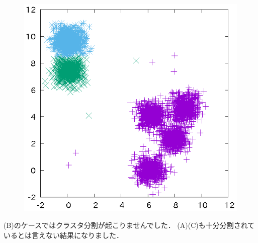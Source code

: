 ﻿\documentclass{jsarticle}
\begin{document}
\begin{figure}[h]
\begin{center}
\begin{minipage}{.32\textwidth}
\begin{center}
 \end{center}
 \end{minipage}
 \begin{minipage}{.32\textwidth}
 \begin{center}
 \includegraphics[height=.18\textheight]{fig/xb3.eps}
 \end{center}
 \end{minipage}
\end{center}
\end{figure}
(B)のケースではクラスタ分割が起こりませんでした．
(A)(C)も十分分割されているとは言えない結果になりました．
\end{document}
